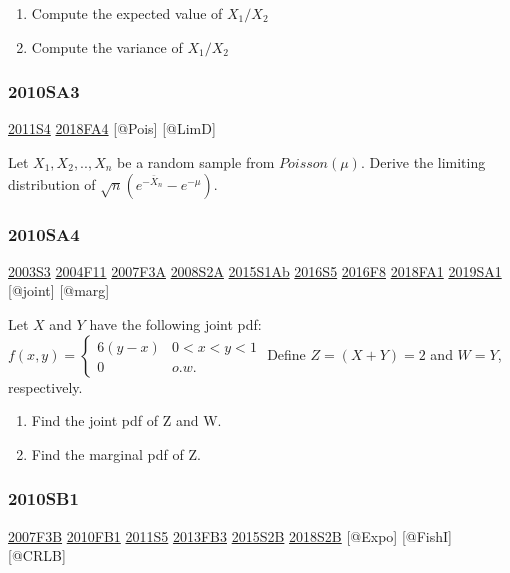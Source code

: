 \documentclass[6pt,Portrait]{article}
\begin{document}
\begin{enumerate}
\def\labelenumi{(\alph{enumi})}
\item
  Compute the expected value of \(X_1/X_2\)
\item
  Compute the variance of \(X_1/X_2\)
\end{enumerate}

\hypertarget{sa3-1}{%
\subsubsection{2010SA3}\label{sa3-1}}

\protect\hyperlink{s4-2}{2011S4} \protect\hyperlink{fa4-4}{2018FA4}
{[}@Pois{]} {[}@LimD{]}

Let \(X_1,X_2,..,X_n\) be a random sample from \(Poisson(\mu)\). Derive
the limiting distribution of \(\sqrt{n}(e^{-\bar X_n}-e^{-\mu})\).

\hypertarget{sa4-1}{%
\subsubsection{2010SA4}\label{sa4-1}}

\protect\hyperlink{s3}{2003S3} \protect\hyperlink{f11}{2004F11}
\protect\hyperlink{f3a}{2007F3A} \protect\hyperlink{s2a}{2008S2A}
\protect\hyperlink{s1ab}{2015S1Ab} \protect\hyperlink{s5-4}{2016S5}
\protect\hyperlink{f8-4}{2016F8} \protect\hyperlink{fa1-4}{2018FA1}
\protect\hyperlink{sa1-3}{2019SA1} {[}@joint{]} {[}@marg{]}

Let \(X\) and \(Y\) have the following joint pdf:
\(f(x,y) =\begin{cases}6(y-x)& 0<x<y<1\\0& o.w.\end{cases}\) Define
\(Z=(X+Y)=2\) and \(W=Y\), respectively.

\begin{enumerate}
\def\labelenumi{(\alph{enumi})}
\item
  Find the joint pdf of Z and W.
\item
  Find the marginal pdf of Z.
\end{enumerate}

\hypertarget{sb1-1}{%
\subsubsection{2010SB1}\label{sb1-1}}

\protect\hyperlink{f3b}{2007F3B} \protect\hyperlink{fb1-1}{2010FB1}
\protect\hyperlink{s5-2}{2011S5} \protect\hyperlink{fb3-2}{2013FB3}
\protect\hyperlink{s2b-1}{2015S2B} \protect\hyperlink{s2b-2}{2018S2B}
{[}@Expo{]} {[}@FishI{]} {[}@CRLB{]}
\end{document}
